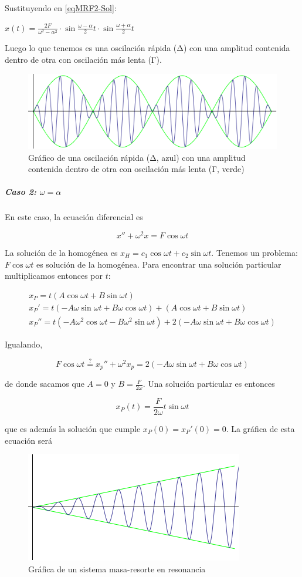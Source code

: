 \documentclass{mathnotes}
\begin{document}
Sustituyendo en \eqref{eqMRF2-Sol}:

\( x(t) = \frac{2F}{ω^2-α^2} ·\sin \frac{ω-α}{2}t · \sin \frac{ω+α}{2}t  \)

Luego lo que tenemos es una oscilación rápida (Δ) con una amplitud contenida dentro de otra con oscilación más lenta (Γ).

\begin{figure}
\centering
\includegraphics{img/MasaResorteF.png}
\caption{Gráfico de una oscilación rápida (Δ, azul) con una amplitud contenida dentro de otra con oscilación más lenta (Γ, verde)}
\label{imgMasaResorteF}
\end{figure}

\subparagraph{Caso 2: $ω=α$}

En este caso, la ecuación diferencial es 

\[ x'' + ω^2 x = F\cos ωt \]

La solución de la homogénea es $x_H = c_1 \cos ωt + c_2 \sin ωt$. Tenemos un problema: $F\cos ωt$ es solución de la homogénea. Para encontrar una solución particular multiplicamos entonces por $t$:

\begin{gather*}
x_P = t\left(A\cos ωt + B\sin ωt\right) \\
x_P' =t\left(-Aω\sin ωt + Bω\cos ωt\right) + \left(A\cos ωt + B\sin ωt\right) \\
x_P'' = t\left(-Aω^2 \cos ωt - Bω^2 \sin ωt\right) + 2\left(-Aω\sin ωt + Bω\cos ωt \right)
\end{gather*}

Igualando, 

\[ F\cos ωt \stackrel{?}{=} x_p'' + ω^2x_p = 2\left(-Aω\sin ωt + Bω\cos ωt \right) \]

de donde sacamos que $A=0$ y $B=\frac{F}{2ω}$. Una solución particular es entonces

\[ x_P(t) = \frac{F}{2ω}t \sin ωt \]

que es además la solución que cumple $x_P(0) = x_P'(0) = 0$. La gráfica de esta ecuación será

\begin{figure}[hbtp]
\centering
\includegraphics{img/MasaResorteF-Resonancia.png}
\caption{Gráfica de un sistema masa-resorte en resonancia}
\label{imgMasaResorteFR}
\end{figure}
\end{document}
